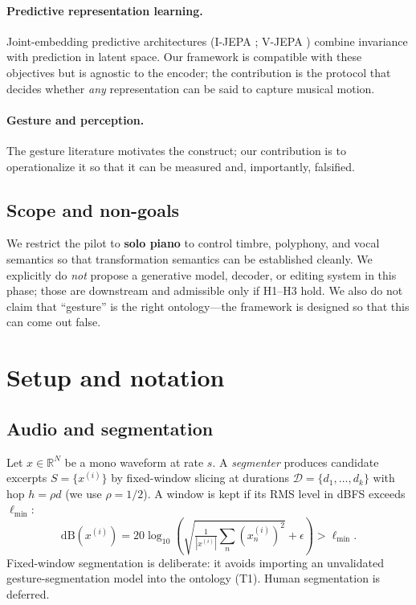 \documentclass[11pt]{article}
\newcommand{\R}{\mathbb{R}}
\newcommand{\cD}{\mathcal{D}}
\begin{document}
\paragraph{Predictive representation learning.}
Joint-embedding predictive architectures (I-JEPA \citep{assran2023ijepa};
V-JEPA \citep{bardes2024vjepa}) combine invariance with prediction in latent
space. Our framework is compatible with these objectives but is agnostic to the
encoder; the contribution is the protocol that decides whether \emph{any}
representation can be said to capture musical motion.

\paragraph{Gesture and perception.}
The gesture literature \citep{godoy2010gestures,meyer1956emotion} motivates the
construct; our contribution is to operationalize it so that it can be measured
and, importantly, falsified.

\subsection{Scope and non-goals}
We restrict the pilot to \textbf{solo piano} to control timbre, polyphony, and
vocal semantics so that transformation semantics can be established cleanly. We
explicitly do \emph{not} propose a generative model, decoder, or editing system in
this phase; those are downstream and admissible only if H1--H3 hold. We also do not
claim that ``gesture'' is the right ontology---the framework is designed so that
this can come out false.

\section{Setup and notation}

\subsection{Audio and segmentation}
Let $x \in \R^{N}$ be a mono waveform at rate $s$. A \emph{segmenter} produces
candidate excerpts $S=\{x^{(i)}\}$ by fixed-window slicing at durations
$\cD=\{d_1,\dots,d_k\}$ with hop $h=\rho d$ (we use $\rho=1/2$). A window is kept
if its RMS level in dBFS exceeds $\ell_{\min}$:
\begin{equation}
\mathrm{dB}(x^{(i)}) = 20\log_{10}\!\left(\sqrt{\tfrac{1}{|x^{(i)}|}\textstyle\sum_n (x^{(i)}_n)^2}+\epsilon\right) > \ell_{\min}.
\end{equation}
Fixed-window segmentation is deliberate: it avoids importing an unvalidated
gesture-segmentation model into the ontology (T1). Human segmentation is deferred.
\end{document}
